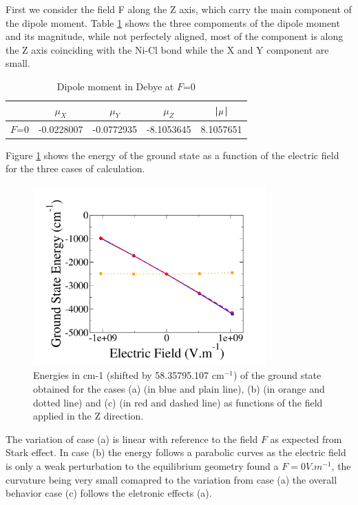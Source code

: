 \documentclass[10pt]{report}
\numberwithin{equation}{section}
\begin{document}
First we consider the field F along the Z axis, which carry the main component of the dipole moment.
Table \ref{tab:DipF0Z} shows the three compoments of the dipole moment and its magnitude, while not perfectely aligned, most of the component is along the Z axis coinciding with the Ni-Cl bond while the X and Y component are small.

\begin{table}[h]
    \centering
    \begin{tabular}{|c | c c c | c|}
        \hline
        & $\mu_X$ & $\mu_Y$ & $\mu_Z$ & |$\vb \mu$|\\
        \hline
        $F$=0 & -0.0228007 & -0.0772935 & -8.1053645 & 8.1057651   \\
        \hline
    \end{tabular}
    \caption{Dipole moment in Debye at $F$=0}
    \label{tab:DipF0Z}
\end{table}

Figure \ref{GSE_Z} shows the energy of the ground state as a function of the electric field for the three cases of calculation.

\begin{figure}[!h]
    \centering
    \includegraphics[width=0.8\textwidth]{Images/E_Z_grand.png}
    \caption{Energies in cm-1 (shifted by 58.35795.107 cm$^{-1}$) of the ground state obtained for the cases (a) (in blue and plain line), (b)
    (in orange and dotted line) and (c) (in red and dashed line) as functions of the field applied in the Z direction.}
    \label{GSE_Z}
\end{figure}

The variation of case (a) is linear with reference to the field $F$ as expected from Stark effect.
In case (b) the energy follows a parabolic curves as the electric field is only a weak perturbation to the equilibrium geometry found a $F=0V.m^{-1}$, the curvature being very small comapred to the variation from case (a) the overall behavior case (c) follows the eletronic effects (a).
\end{document}
